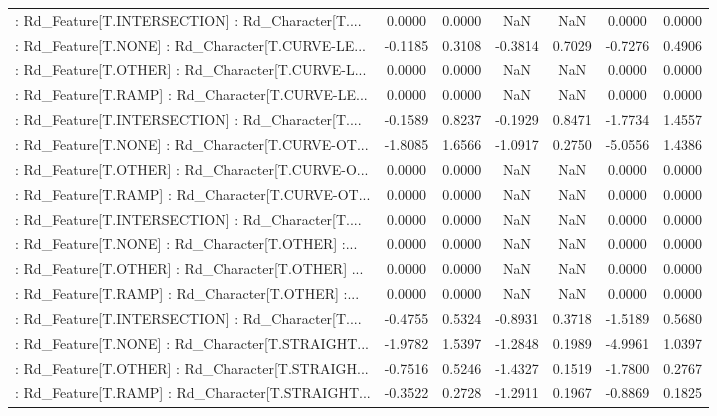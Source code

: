 \begin{longtable}{p{4cm}cccccc}
 : Rd\_Feature[T.INTERSECTION] : Rd\_Character[T.... &  0.0000 &    0.0000 &     NaN &          NaN &  0.0000 &  0.0000 \\
 : Rd\_Feature[T.NONE] : Rd\_Character[T.CURVE-LE... & -0.1185 &    0.3108 & -0.3814 &       0.7029 & -0.7276 &  0.4906 \\
 : Rd\_Feature[T.OTHER] : Rd\_Character[T.CURVE-L... &  0.0000 &    0.0000 &     NaN &          NaN &  0.0000 &  0.0000 \\
 : Rd\_Feature[T.RAMP] : Rd\_Character[T.CURVE-LE... &  0.0000 &    0.0000 &     NaN &          NaN &  0.0000 &  0.0000 \\
 : Rd\_Feature[T.INTERSECTION] : Rd\_Character[T.... & -0.1589 &    0.8237 & -0.1929 &       0.8471 & -1.7734 &  1.4557 \\
 : Rd\_Feature[T.NONE] : Rd\_Character[T.CURVE-OT... & -1.8085 &    1.6566 & -1.0917 &       0.2750 & -5.0556 &  1.4386 \\
 : Rd\_Feature[T.OTHER] : Rd\_Character[T.CURVE-O... &  0.0000 &    0.0000 &     NaN &          NaN &  0.0000 &  0.0000 \\
 : Rd\_Feature[T.RAMP] : Rd\_Character[T.CURVE-OT... &  0.0000 &    0.0000 &     NaN &          NaN &  0.0000 &  0.0000 \\
 : Rd\_Feature[T.INTERSECTION] : Rd\_Character[T.... &  0.0000 &    0.0000 &     NaN &          NaN &  0.0000 &  0.0000 \\
 : Rd\_Feature[T.NONE] : Rd\_Character[T.OTHER] :... &  0.0000 &    0.0000 &     NaN &          NaN &  0.0000 &  0.0000 \\
 : Rd\_Feature[T.OTHER] : Rd\_Character[T.OTHER] ... &  0.0000 &    0.0000 &     NaN &          NaN &  0.0000 &  0.0000 \\
 : Rd\_Feature[T.RAMP] : Rd\_Character[T.OTHER] :... &  0.0000 &    0.0000 &     NaN &          NaN &  0.0000 &  0.0000 \\
 : Rd\_Feature[T.INTERSECTION] : Rd\_Character[T.... & -0.4755 &    0.5324 & -0.8931 &       0.3718 & -1.5189 &  0.5680 \\
 : Rd\_Feature[T.NONE] : Rd\_Character[T.STRAIGHT... & -1.9782 &    1.5397 & -1.2848 &       0.1989 & -4.9961 &  1.0397 \\
 : Rd\_Feature[T.OTHER] : Rd\_Character[T.STRAIGH... & -0.7516 &    0.5246 & -1.4327 &       0.1519 & -1.7800 &  0.2767 \\
 : Rd\_Feature[T.RAMP] : Rd\_Character[T.STRAIGHT... & -0.3522 &    0.2728 & -1.2911 &       0.1967 & -0.8869 &  0.1825 \\

\end{longtable}
